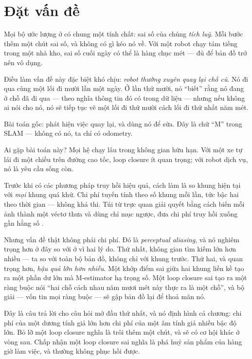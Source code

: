 \documentclass[../../vslam.tex]{subfiles}
\begin{document}
\section{Đặt vấn đề}

Mọi bộ ước lượng ở  có chung một tính chất: sai số của chúng \emph{tích luỹ}. Mỗi bước thêm một chút sai số, và không có gì kéo nó về. Với một robot chạy tám tiếng trong một nhà kho, sai số cuối ngày có thể là hàng chục mét --- đủ để bản đồ trở nên vô dụng.

Điều làm vấn đề này đặc biệt khó chịu: \emph{robot thường xuyên quay lại chỗ cũ}. Nó đi qua cùng một lối đi mười lần một ngày. Ở lần thứ mười, nó ``biết'' rằng nó đang ở chỗ đã đi qua --- theo nghĩa thông tin đó có trong dữ liệu --- nhưng nếu không ai nói cho nó, nó sẽ tiếp tục vẽ một lối đi thứ mười cách lối đi thứ nhất năm mét.

Bài toán gốc: phát hiện việc quay lại, và dùng nó để sửa. Đây là chữ ``M'' trong SLAM --- không có nó, ta chỉ có odometry.

Ai gặp bài toán này? Mọi hệ chạy lâu trong không gian hữu hạn. Với một xe tự lái đi một chiều trên đường cao tốc, loop closure ít quan trọng; với robot dịch vụ, nó là yêu cầu sống còn.

Trước khi có các phương pháp truy hồi hiệu quả, cách làm là so khung hiện tại với \emph{mọi} khung quá khứ. Chi phí tuyến tính theo số khung mỗi lần, tức bậc hai theo thời gian --- không khả thi. Túi từ trực quan giải quyết bằng cách biến mỗi ảnh thành một véctơ thưa và dùng chỉ mục ngược, đưa chi phí truy hồi xuống gần hằng số \cite{galvezlopez2012dbow2}.

Nhưng vấn đề thật không phải chi phí. Đó là \emph{perceptual aliasing}, và nó nghiêm trọng hơn ở đây so với ở  vì hai lý do. Thứ nhất, không gian tìm kiếm lớn hơn nhiều --- ta so với toàn bộ bản đồ, không chỉ với khung trước. Thứ hai, và quan trọng hơn, \emph{hậu quả lớn hơn nhiều}. Một khớp điểm sai giữa hai khung liền kề tạo ra một phần dư lớn mà M-estimator hạ trọng số. Một loop closure sai tạo ra một ràng buộc nói ``hai chỗ cách nhau năm mươi mét này thực ra là một chỗ'', và bộ giải --- vốn tin mọi ràng buộc --- sẽ gập bản đồ lại để thoả mãn nó.

Đây là câu trả lời cho câu hỏi mở đầu thứ nhất, và nó định hình cả chương: chi phí của một dương tính giả lớn hơn chi phí của một âm tính giả nhiều bậc độ lớn. Bỏ lỡ một loop closure nghĩa là trôi thêm một chút, và sẽ có cơ hội khác ở vòng sau. Chấp nhận một loop closure sai nghĩa là phá huỷ sản phẩm của hàng giờ làm việc, và thường không phục hồi được.
\end{document}
